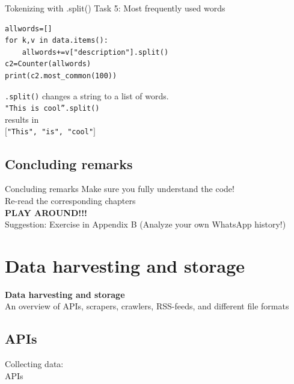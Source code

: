 \documentclass{beamer}
\begin{document}
\begin{frame}[fragile]{Tokenizing with .split()}
Task 5: Most frequently used words
\begin{lstlisting}
allwords=[]
for k,v in data.items():
    allwords+=v["description"].split()
c2=Counter(allwords)
print(c2.most_common(100))
\end{lstlisting}
\scriptsize{
\texttt{.split()} changes a string to a list of words.\\ \texttt{"This is cool''.split()} \\results in\\ \texttt{$[$"This", "is", "cool"$]$}\\
}
\end{frame}


\subsection{Concluding remarks}
\begin{frame}{Concluding remarks}
Make sure you fully understand the code!\\
\vspace{1cm}
Re-read the corresponding chapters\\
\vspace{1cm}
\textbf{PLAY AROUND!!!}\\

Suggestion: Exercise in Appendix B (Analyze your own WhatsApp history!)
\end{frame}


\fi


\section{Data harvesting and storage}
\begin{frame}[plain]
\textbf{Data harvesting and storage}\\
\vspace{1cm}
An overview of APIs, scrapers, crawlers, RSS-feeds, and different file formats
\end{frame}



\subsection{APIs}
\begin{frame}
	Collecting data:\\
	APIs
\end{frame}
\end{document}
